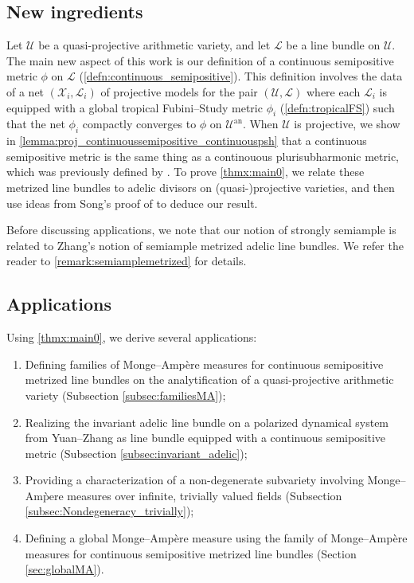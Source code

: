 \documentclass[11pt,reqno]{amsart}
\newcommand{\cX}{\mathcal{X}}
\newcommand{\cU}{\mathcal{U}}
\newcommand{\cL}{\mathcal{L}}
\theoremstyle{theorem}
\numberwithin{equation}{subsection}
\numberwithin{equation}{subsection}
\theoremstyle{definition}
\theoremstyle{remark}
\numberwithin{equation}{subsubsection} \numberwithin{figure}{section}
\DeclareMathOperator{\an}{an}
\begin{document}
\subsection*{New ingredients}
Let $\cU$ be a quasi-projective arithmetic variety, and let $\cL$ be a line bundle on $\cU$. 
The main new aspect of this work is our definition of a continuous semipositive metric $\phi$ on $\cL$ (\autoref{defn:continuous_semipositive}). 
This definition involves the data of a net $(\cX_i,\cL_i)$ of projective models for the pair $(\cU,\cL)$ where each $\cL_i$ is equipped with a global tropical Fubini--Study metric $\phi_i$ (\autoref{defn:tropicalFS}) such that the net $\phi_i$ compactly converges to $\phi$ on $\cU^{\an}$. 
When $\cU$ is projective, we show in \autoref{lemma:proj_continuoussemipositive_continuouspsh} that a continuous semipositive metric is the same thing as a continouous plurisubharmonic metric, which was previously defined by \cite{PilleSchneider:Global}. 
To prove \autoref{thmx:main0}, we relate these metrized line bundles to adelic divisors on (quasi-)projective varieties,  and then use ideas from Song's proof of \cite[Theorem 1.1]{Song:EquivariantAdelic} to deduce our result. 

Before discussing applications, we note that our notion of strongly semiample is related to Zhang's notion \cite{Zhang:PositiveArithmeticVarieties} of semiample metrized adelic line bundles. We refer the reader to \autoref{remark:semiamplemetrized} for details.  

\subsection*{Applications}
Using \autoref{thmx:main0}, we derive several applications:
\begin{enumerate}
\item Defining families of Monge--Amp\`ere measures for continuous semipositive metrized line bundles on the analytification of a quasi-projective arithmetic variety (Subsection \ref{subsec:familiesMA}); 
\item Realizing the invariant adelic line bundle on a polarized dynamical system from Yuan--Zhang as line bundle equipped with a continuous semipositive metric (Subsection \ref{subsec:invariant_adelic});
\item Providing a characterization of a non-degenerate subvariety involving Monge--Am\`pere measures over infinite, trivially valued fields (Subsection \ref{subsec:Nondegeneracy_trivially}); 
\item Defining a global Monge--Amp\`ere measure using the family of Monge--Amp\`ere measures for continuous semipositive metrized line bundles (Section \ref{sec:globalMA}). 
\end{enumerate}
\end{document}
